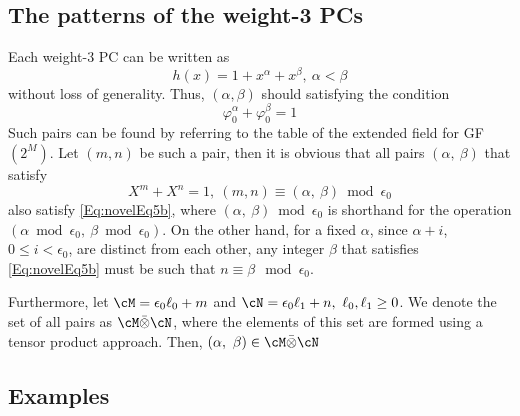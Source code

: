 \subsection{The patterns of the weight-3 PCs}

Each weight-3 PC can be written as 
\begin{equation}
h(x)=1+x^{\alpha}+x^{\beta},~\alpha < \beta
\label{novelEqwt3}
\end{equation}
without loss of generality. 
Thus, $(\alpha,\beta)$ should satisfying the condition
\begin{equation}
\varphi_0^{\alpha}+\varphi_0^{\beta}= 1
\label{Eq:novelEq5b}
\end{equation}
Such pairs can be found by referring to the table of the extended field for GF$(2^M)$. 
Let $(m,n)$ be such a pair, then it is obvious that all pairs $(\alpha,~\beta)$  that satisfy
\begin{equation}
X^m+X^n = 1,~ (m,n) \equiv (\alpha,~\beta) \bmod \epsilon_0%
\end{equation}
also satisfy \eqref{Eq:novelEq5b}, where $(\alpha,~\beta) \bmod \epsilon_0$ is shorthand for the operation $(\alpha \bmod \epsilon_0,~\beta \bmod \epsilon_0)$. On the other hand, for a fixed $\alpha$, since $\alpha+i$, $0 \leq i < \epsilon_0$, are distinct from each other, any integer $\beta$ that satisfies \eqref{Eq:novelEq5b} must be such that $n\equiv \beta \mod \epsilon_0$.

Furthermore, let $\cM=\epsilon_0 \ell_0+m$ and $\cN=\epsilon_0 \ell_1+n,~\ell_0, \ell_1 \geq 0$. We denote the set of all pairs as $\cM \bar{\otimes} \cN$, where the elements of this set are formed using a tensor product approach. Then, $(\alpha,~\beta) \in \cM \bar{\otimes} \cN$
\subsection{Examples}

